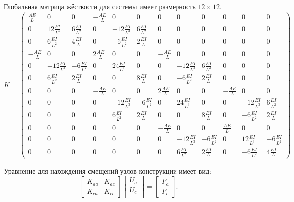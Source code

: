 \documentclass{article}
\begin{document}
Глобальная матрица жёсткости для системы имеет размерность $12 \times 12$.
\begin{equation*}
  K = \left(
  \begin{smallmatrix}
    \frac{AE}{L}& 0& 0& -\frac{AE}{L}& 0& 0& 0& 0& 0& 0& 0& 0\\
     0& 12\frac{EI}{L^3}& 6\frac{EI}{L^2}& 0& -12\frac{EI}{L^3}& 6\frac{EI}{L^2}& 0& 0& 0& 0& 0& 0\\
     0& 6\frac{EI}{L^2}& 4\frac{EI}{L}& 0& -6\frac{EI}{L^2}& 2\frac{EI}{L}& 0& 0& 0& 0& 0& 0\\
     -\frac{AE}{L}& 0& 0& 2\frac{AE}{L}& 0& 0& -\frac{AE}{L}& 0& 0& 0& 0& 0\\
     0& -12\frac{EI}{L^3}& -6\frac{EI}{L^2}& 0& 24\frac{EI}{L^3}& 0& 0& -12\frac{EI}{L^3}& 6\frac{EI}{L^2}& 0& 0& 0\\
     0& 6\frac{EI}{L^2}& 2\frac{EI}{L}& 0& 0& 8\frac{EI}{L}& 0& -6\frac{EI}{L^2}& 2\frac{EI}{L}& 0& 0& 0\\
     0& 0& 0& -\frac{AE}{L}& 0& 0& 2\frac{AE}{L}& 0& 0& -\frac{AE}{L}& 0& 0\\
     0& 0& 0& 0& -12\frac{EI}{L^3}& -6\frac{EI}{L^2}& 0& 24\frac{EI}{L^3}& 0& 0& -12\frac{EI}{L^3}& 6\frac{EI}{L^2}\\
     0& 0& 0& 0& 6\frac{EI}{L^2}& 2\frac{EI}{L}& 0& 0& 8\frac{EI}{L}& 0& -6\frac{EI}{L^2}& 2\frac{EI}{L}\\
     0& 0& 0& 0& 0& 0& -\frac{AE}{L}& 0& 0& \frac{AE}{L}& 0& 0\\
     0& 0& 0& 0& 0& 0& 0& -12\frac{EI}{L^3}& -6\frac{EI}{L^2}& 0& 12\frac{EI}{L^3}& -6\frac{EI}{L^2}\\
     0& 0& 0& 0& 0& 0& 0& 6\frac{EI}{L^2}& 2\frac{EI}{L}& 0& -6\frac{EI}{L^2}& 4\frac{EI}{L}
  \end{smallmatrix}\right)
\end{equation*}

Уравнение для нахождения смещений узлов конструкции имеет вид:
\begin{equation*}
  \begin{bmatrix}
    K_{aa}& K_{ac} \\
    K_{ca}& K_{cc}
  \end{bmatrix}
  \begin{bmatrix}
    U_a\\
    U_c\\
  \end{bmatrix}
  =
  \begin{bmatrix}
    F_a\\
    F_c
  \end{bmatrix}.
\end{equation*}
\end{document}
